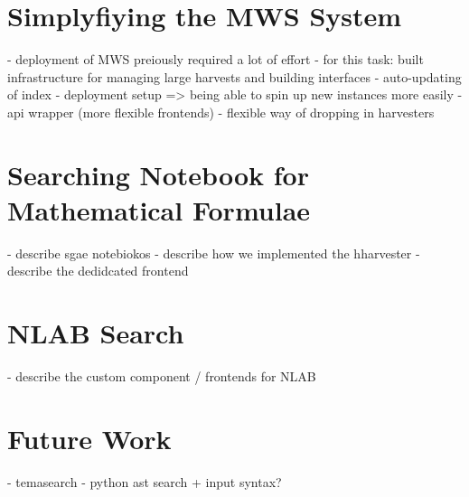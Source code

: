 \documentclass[a4paper,twoside,12pt]{article}
\begin{document}
\section{Simplyfiying the MWS System}

- deployment of MWS preiously required a lot of effort
- for this task: built infrastructure for managing large harvests and building interfaces
    - auto-updating of index
    - deployment setup => being able to spin up new instances more easily
    - api wrapper (more flexible frontends)
    - flexible way of dropping in harvesters

\section{Searching Notebook for Mathematical Formulae}

- describe sgae notebiokos
- describe how we implemented the hharvester
- describe the dedidcated frontend

\section{NLAB Search}

- describe the custom component / frontends for NLAB

\section{Future Work}

- temasearch
- python ast search + input syntax?
\end{document}
